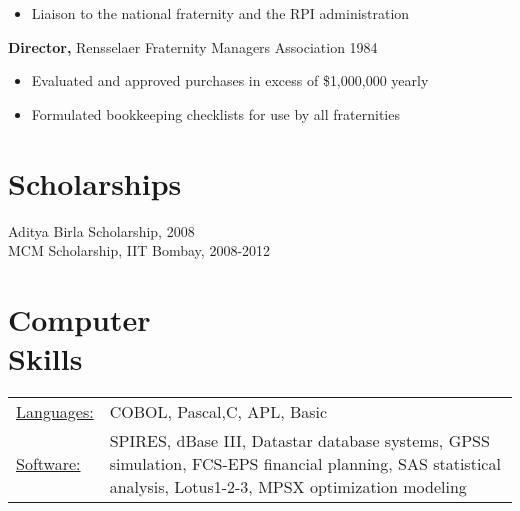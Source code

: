 \documentclass[margin]{res}
\begin{document}
\begin{resume}
\begin{itemize}
                 \item Liaison to the national fraternity and the RPI
                 administration
     \end{itemize}

                  {\bf  Director,}  Rensselaer Fraternity Managers
              Association     \hfill                                 1984
                 \begin{itemize} \itemsep -2pt

               \item    Evaluated and approved purchases in excess of
                 {\$}1,000,000 yearly

               \item  Formulated bookkeeping checklists for use by all
                 fraternities
     \end{itemize}

\section{Scholarships}
Aditya Birla Scholarship, 2008 \\
MCM Scholarship, IIT Bombay, 2008-2012 \\


\section{Computer \\ Skills}
   \begin{tabular}{l p{3in}}
    \underline{Languages:} & COBOL, Pascal,C, APL, Basic \\

     \underline{Software:} &  SPIRES, dBase III, Datastar database
                        systems, GPSS simulation, FCS-EPS financial
                        planning, SAS statistical analysis,
                        Lotus1-2-3, MPSX optimization modeling
 \end{tabular}

\end{resume}
\end{document}
